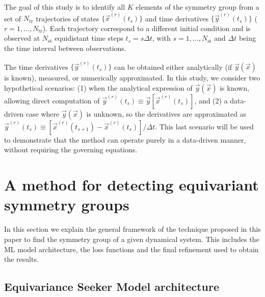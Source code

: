 
The goal of this study is to identify all $K$ elements of the symmetry group from a set of $N_{\mathrm{tr}}$ trajectories of states $\{ \vec{x}^{(r)}(t_s) \}$ and time derivatives $\{ \vec{y}^{(r)}(t_s) \}$ ($r = 1, \dots, N_{\mathrm{tr}}$). Each trajectory correspond to a different initial condition and is observed at $N_{\mathrm{st}}$ equidistant time steps $t_s = s\Delta t$, with $s = 1, \dots, N_{\mathrm{st}}$ and $\Delta t$ being the time interval between observations.


The time derivatives $\{ \vec{y}^{(r)}(t_s) \}$ can be obtained either analytically (if $\vec{y}(\vec{x})$ is known), measured, or numerically approximated. In this study, we consider two hypothetical scenarios: (1) when the analytical expression of $\vec{y}(\vec{x})$ is known, allowing direct computation of $\vec{y}^{(r)}(t_s) \equiv \vec{y}[\vec{x}^{(r)}(t_s)]$, and (2) a data-driven case where $\vec{y}(\vec{x})$ is unknown, so the derivatives are approximated as $\vec{y}^{(r)}(t_s) \equiv \left[\vec{x}^{(r)}(t_{s+1}) - \vec{x}^{(r)}(t_s)\right]/\Delta t$. This last scenario will be used to demonstrate that the method can operate purely in a data-driven manner, without requiring the governing equations.




\section{A method for detecting equivariant symmetry groups}\label{sec:ESM_method}


In this section we explain the general framework of the technique proposed in this paper to find the symmetry group of a given dynamical system. This includes the ML model architecture, the loss functions and the final refinement used to obtain the results.


\subsection{Equivariance Seeker Model architecture}\label{sec:ESM_arch}

